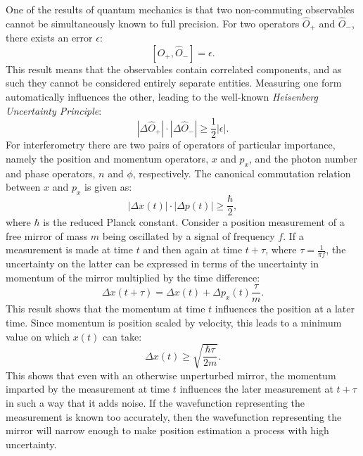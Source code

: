 One of the results of quantum mechanics is that two non-commuting observables cannot be simultaneously known to full precision. For two operators $\hat{O}_+$ and $\hat{O}_-$, there exists an error $\epsilon$:
\begin{equation}
 \left[ \hat{O}_+, \hat{O}_- \right] = \epsilon.
\end{equation}
This result means that the observables contain correlated components, and as such they cannot be considered entirely separate entities. Measuring one form automatically influences the other, leading to the well-known \emph{Heisenberg Uncertainty Principle}:
\begin{equation}
 \left| \Delta \hat{O}_+ \right| \cdot \left| \Delta \hat{O}_- \right| \geq
\frac{1}{2} \left| \epsilon \right|.
\end{equation}
For interferometry there are two pairs of operators of particular importance, namely the position and momentum operators, $x$ and $p_x$, and the photon number and phase operators, $n$ and $\phi$, respectively. The canonical commutation relation between $x$ and $p_x$ is given as:
\begin{equation}
 | \Delta x\left( t \right) | \cdot |\Delta p\left( t \right) | \geq
\frac{\hbar}{2},
 \label{eq:heisenburguncertainty}
\end{equation}
where $\hbar$ is the reduced Planck constant. Consider a position measurement of a free mirror of mass $m$ being oscillated by a signal of frequency $f$. If a measurement is made at time $t$ and then again at time $t + \tau$, where $\tau = \frac{1}{\pi f}$, the uncertainty on the latter can be expressed in terms of the uncertainty in momentum of the mirror multiplied by the time difference:
\begin{equation}
 \Delta x \left( t + \tau \right) = \Delta x \left( t \right) + \Delta p_x
\left( t \right) \frac{\tau}{m}.
 \label{eq:heisenburgtime}
\end{equation}
This result shows that the momentum at time $t$ influences the position at a later time. Since momentum is position scaled by velocity, this leads to a minimum value on which $x \left( t \right)$ can take:
\begin{equation}
 \Delta x \left( t \right) \geq \sqrt{\frac{\hbar \tau}{2m}}.
\end{equation}
This shows that even with an otherwise unperturbed mirror, the momentum imparted by the measurement at time $t$ influences the later measurement at $t + \tau$ in such a way that it adds noise. If the wavefunction representing the measurement is known too accurately, then the wavefunction representing the mirror will narrow enough to make position estimation a process with high
uncertainty.

